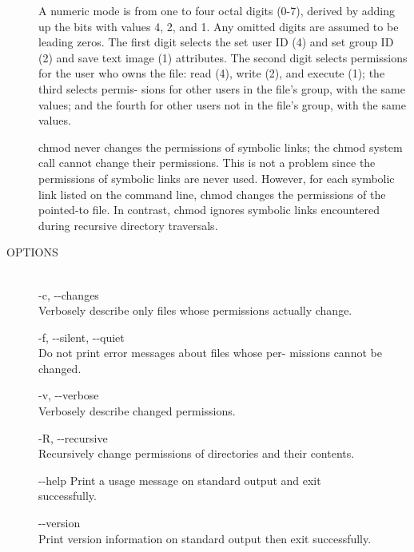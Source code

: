 \begin{description}
       A  numeric  mode  is  from one to four octal digits (0-7),
       derived by adding up the bits with values  4,  2,  and  1.
       Any  omitted  digits are assumed to be leading zeros.  The
       first digit selects the set user ID (4) and set  group  ID
       (2)  and save text image (1) attributes.  The second digit
       selects permissions for the user who owns the  file:  read
       (4), write (2), and execute (1); the third selects permis-
       sions for other users in the file's group, with  the  same
       values;  and  the fourth for other users not in the file's
       group, with the same values.

       chmod never changes the permissions of symbolic links; the
       chmod  system  call cannot change their permissions.  This
       is not a problem since the permissions of  symbolic  links
       are never used.  However, for each symbolic link listed on
       the command line, chmod changes  the  permissions  of  the
       pointed-to  file.   In  contrast,  chmod  ignores symbolic
       links encountered during recursive directory traversals.

\item[OPTIONS] \hfill \\
       -c, -\hspace{.01cm}-changes \\
              Verbosely describe  only  files  whose  permissions
              actually change.

       -f, -\hspace{.01cm}-silent, -\hspace{.01cm}-quiet \\
              Do  not print error messages about files whose per-
              missions cannot be changed.

       -v, -\hspace{.01cm}-verbose \\
              Verbosely describe changed permissions.

       -R, -\hspace{.01cm}-recursive \\
              Recursively change permissions of  directories  and
              their contents.

       -\hspace{.01cm}-help Print  a  usage message on standard output and exit \\
              successfully.

       -\hspace{.01cm}-version \\
              Print version information on standard  output  then
              exit successfully.
\end{description}

